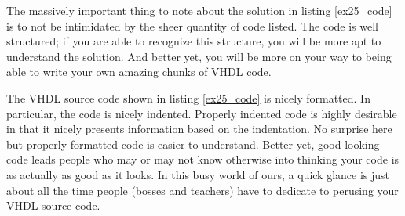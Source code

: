 \begin{my_list}
\item The massively important thing to note about the solution in listing \ref{ex25_code} is to not be intimidated by the sheer quantity of code listed. The code is well structured; if you are able to recognize this structure, you will be more apt to understand the solution. And better yet, you will be more on your way to being able to write your own amazing chunks of VHDL code. 

\item The VHDL source code shown in listing \ref{ex25_code} is nicely formatted. In particular, the code is nicely indented. Properly indented code is highly desirable in that it nicely presents information based on the indentation. No surprise here but properly formatted code is easier to understand. Better yet, good looking code leads people who may or may not know otherwise into thinking your code is as actually as good as it looks. In this busy world of ours, a quick glance is just about all the time people (bosses and teachers) have to dedicate to perusing your VHDL source code.
\end{my_list}

